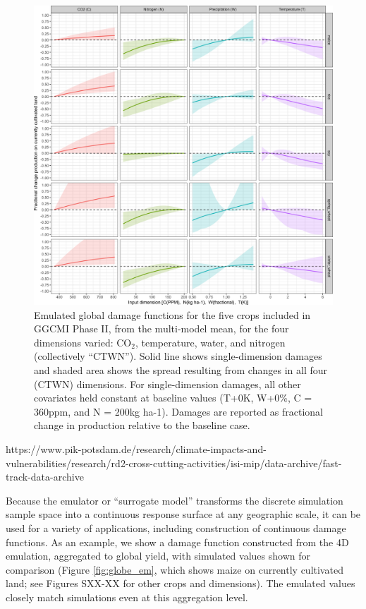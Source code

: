 \documentclass[gmd, manuscript]{copernicus} %
\begin{document}
\begin{figure}[ht]
  \centering
  \includegraphics[width=15cm]{figures/em_CTWN_all_crops.png}
  \caption{Emulated global damage functions for the five crops included in GGCMI Phase II, from the multi-model mean, for the four dimensions varied: CO$_2$, temperature, water, and nitrogen (collectively ``CTWN''). 
  Solid line shows single-dimension damages and shaded area shows the spread resulting from changes in all four (CTWN) dimensions.
  For single-dimension damages, all other covariates held constant at baseline values (T+0K, W+0\%, C = 360ppm, and N = 200kg ha-1). Damages are reported as fractional change in production relative to the baseline case.}
  \label{fig:all_dims}
\end{figure}

https://www.pik-potsdam.de/research/climate-impacts-and-vulnerabilities/research/rd2-cross-cutting-activities/isi-mip/data-archive/fast-track-data-archive

Because the emulator or ``surrogate model'' transforms the discrete simulation sample space into a continuous response surface at any geographic scale, it can be used for a variety of applications, including construction of continuous damage functions. 
As an example, we show a damage function constructed from the 4D emulation, aggregated to global yield, with simulated values shown for comparison (Figure \ref{fig:globe_em}, which shows maize on currently cultivated land; see Figures SXX-XX for other crops and dimensions). 
The emulated values closely match simulations even at this aggregation level.
\end{document}

